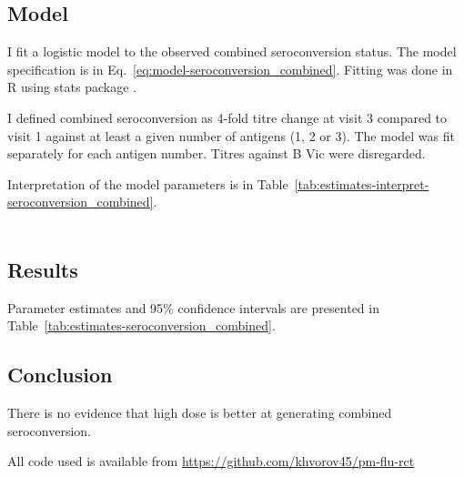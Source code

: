 \documentclass[11pt]{article}
\begin{document}
\subsection{Model}

I fit a logistic model to the observed combined seroconversion status.
The model specification is in Eq.~\ref{eq:model-seroconversion_combined}.
Fitting was done in R using stats package \cite{R}.

I defined combined seroconversion as 4-fold titre change at visit 3 compared
to visit 1 against
at least a given number of antigens (1, 2 or 3). The model was fit separately
for each antigen number.
Titres against B Vic were disregarded.

Interpretation of the model parameters is in
Table~\ref{tab:estimates-interpret-seroconversion_combined}.

\begin{equation}
    \begin{gathered}
        \label{eq:model-seroconversion_combined}
        
    \end{gathered}
\end{equation}





\subsection{Results}

Parameter estimates and 95\% confidence intervals
are presented in Table~\ref{tab:estimates-seroconversion_combined}.



\subsection{Conclusion}

There is no evidence that high dose is better at generating combined
seroconversion.




All code used is available from \url{https://github.com/khvorov45/pm-flu-rct}
\end{document}
